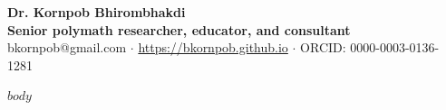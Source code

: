 \documentclass[11pt]{article}
\begin{document}
\thispagestyle{empty}
\begin{center}
  {\LARGE\bfseries\sffamily Dr. Kornpob Bhirombhakdi}\\[6pt]
  \textbf{Senior polymath researcher, educator, and consultant}  \\
  {\small bkornpob@gmail.com $\cdot$ \url{https://bkornpob.github.io} $\cdot$ ORCID: 0000-0003-0136-1281}
\end{center}
\vspace{6pt}

\tableofcontents
\clearpage

$body$
\end{document}
